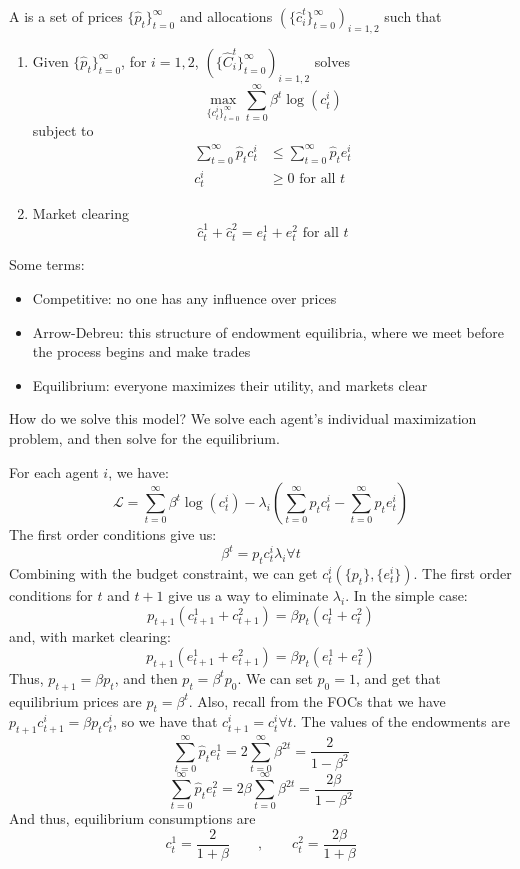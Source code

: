\documentclass[10pt]{article}
\begin{document}
\begin{definition}
	A  is a set of prices $\{\hat{p}_t\}_{t=0}^\infty$ and allocations $(\{\hat{c}_i^t\}_{t=0}^\infty)_{i = 1,2}$ such that
	\begin{enumerate}
		\item Given $\{\hat{p}_t\}_{t=0}^\infty$, for $i = 1,2$, $(\{\hat{C}_i^t\}_{t=0}^\infty)_{i = 1,2}$ solves
		\[
		\max_{\{c_t^i\}_{t=0}^\infty} \sum_{t=0}^\infty \beta^t \log(c_t^i)
		\]
		subject to
		\begin{align*}
			\sum_{t=0}^\infty \hat{p}_t c_t^i &\le \sum_{t=0}^\infty \hat{p}_t e_t^i \\
			c_t^i &\ge 0 \text{ for all } t
		\end{align*}
		\item Market clearing
		\[
		\hat{c}_t^1 + \hat{c}_t^2 = e_t^1 + e_t^2 \text{ for all } t
		\]
	\end{enumerate}
\end{definition}

\begin{definition}
	Some terms:
	\begin{itemize}
		\item Competitive: no one has any influence over prices
		\item Arrow-Debreu: this structure of endowment equilibria, where we meet before the process begins and make trades
		\item Equilibrium: everyone maximizes their utility, and markets clear
	\end{itemize}
\end{definition}

How do we solve this model? We solve each agent's individual maximization problem, and then solve for the equilibrium.

\begin{solution}
For each agent $i$, we have:
\[
\mathcal{L} = \sum_{t=0}^\infty \beta^t \log(c_t^i) - \lambda_i \left(\sum_{t=0}^\infty p_tc_t^i - \sum_{t=0}^\infty p_te_t^i \right)
\]
The first order conditions give us:
\[
\beta^t = p_t c_t^i \lambda_i \forall t
\]
Combining with the budget constraint, we can get $c_t^i(\{p_t\},\{e_t^i\})$. The first order conditions for $t$ and $t+1$ give us a way to eliminate $\lambda_i$. In the simple case:
\[
p_{t+1}(c^1_{t+1} + c^2_{t+1}) = \beta p_t (c_t^1 + c_t^2)
\]
and, with market clearing:
\[
p_{t+1}(e^1_{t+1} + e^2_{t+1}) = \beta p_t (e_t^1 + e_t^2)
\]
Thus, $p_{t+1} = \beta p_t$, and then $p_t = \beta^t p_0$. We can set $p_0 = 1$, and get that equilibrium prices are $\hat{p}_t = \beta^t$. Also, recall from the FOCs that we have $p_{t+1} c^i_{t+1} = \beta p_t c_t^i$, so we have that $c^i_{t+1} = c^i_t \forall t$. The values of the endowments are
\[
\sum_{t=0}^\infty \hat{p}_t e^1_t =  2\sum_{t=0}^\infty \beta^{2t} = \frac{2}{1-\beta^2} 
\]
\[
\sum_{t=0}^\infty \hat{p}_t e^2_t = 2\beta \sum_{t=0}^\infty \beta^{2t} = \frac{2\beta}{1 - \beta^2}
\]
And thus, equilibrium consumptions are
\[
c_t^1 = \frac{2}{1 + \beta} \qquad , \qquad c_t^2 = \frac{2\beta}{1 + \beta}
\]
\end{solution}
\end{document}
